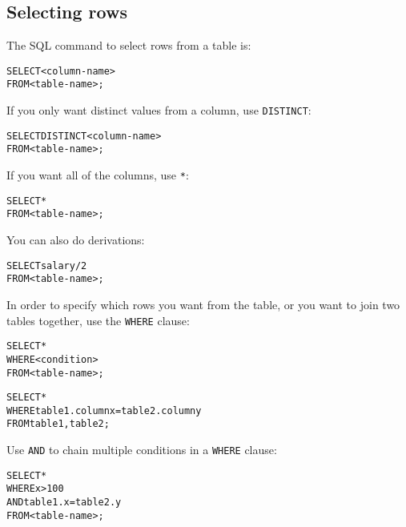 \begin{mymulticols}

  \subsection{Selecting rows}

  The SQL command to select rows from a table is:

  \begin{alltt}
    SELECT <column-name>\\
    FROM <table-name>;
  \end{alltt}

  If you only want distinct values from a column, use \texttt{DISTINCT}:

  \begin{alltt}
    SELECT DISTINCT <column-name>\\
    FROM <table-name>;
  \end{alltt}

  If you want all of the columns, use \texttt{*}:

  \begin{alltt}
    SELECT *\\
    FROM <table-name>;
  \end{alltt}

  You can also do derivations:

  \begin{alltt}
    SELECT salary/2\\
    FROM <table-name>;
  \end{alltt}

  In order to specify which rows you want from the table, or you want to join two
  tables together, use the \texttt{WHERE} clause:

  \begin{alltt}
    SELECT *\\
    WHERE <condition>\\
    FROM <table-name>;
  \end{alltt}

  \begin{alltt}
    SELECT *\\
    WHERE table1.columnx = table2.columny\\
    FROM table1, table2;
  \end{alltt}

  Use \texttt{AND} to chain multiple conditions in a \texttt{WHERE} clause:

  \begin{alltt}
    SELECT *\\
    WHERE x > 100\\
    AND table1.x = table2.y\\
    FROM <table-name>;
  \end{alltt}


\end{mymulticols}
